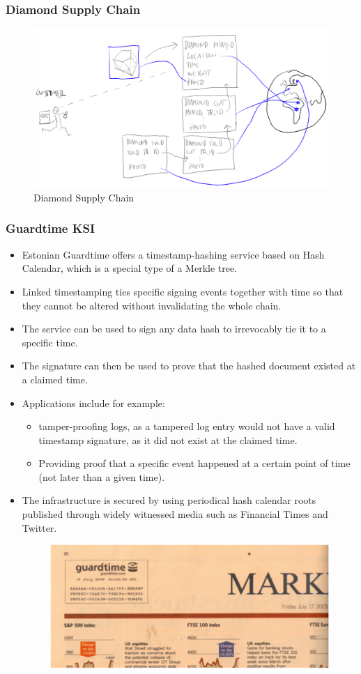 \documentclass[8pt]{beamer}
\begin{document}
\begin{frame}
\frametitle{Diamond Supply Chain}

\begin{figure}[tb]
 \centering
 \includegraphics[width=11 cm,keepaspectratio=true]{./blockchain_images/diamond.png}
 \caption{Diamond Supply Chain}
\end{figure}
\end{frame}

\begin{frame}
\frametitle{Guardtime KSI}
\begin{itemize}
 \item Estonian Guardtime offers a timestamp-hashing service based on Hash Calendar, which is a special type of a Merkle tree.
 \item Linked timestamping ties specific signing events together with time so that they cannot be altered without invalidating the whole chain.
 \item The service can be used to sign any data hash to irrevocably tie it to a specific time.
 \item The signature can then be used to prove that the hashed document existed at a claimed time.
 \item Applications include for example:
 \begin{itemize}
   \item tamper-proofing logs, as a tampered log entry would not have a valid timestamp signature, as it did not exist at the claimed time.
   \item Providing proof that a specific event happened at a certain point of time (not later than a given time).
 \end{itemize}
 \item The infrastructure is secured by using periodical hash calendar roots published through widely witnessed media such as Financial Times and Twitter.
\begin{figure}[tb]
 \centering
 \includegraphics[width=3 cm,keepaspectratio=true]{./blockchain_images/widely_witnessed_media.png}
\end{figure}
\end{itemize}

\end{frame}
\end{document}

